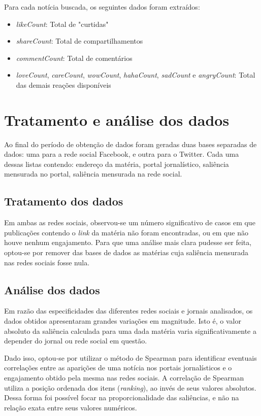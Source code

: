 \documentclass[
	12pt,
	oneside,
	a4paper,
	english,
	brazil
]{abntex2ppgsi}
\begin{document}
Para cada notícia buscada, os seguintes dados foram extraídos:
\begin{itemize}
    \item \textit{likeCount}: Total de "curtidas"
    \item \textit{shareCount}: Total de compartilhamentos
    \item \textit{commentCount}: Total de comentários
    \item \textit{loveCount}, \textit{careCount}, \textit{wowCount}, \textit{hahaCount}, \textit{sadCount} e \textit{angryCount}: Total das demais reações disponíveis
\end{itemize}

\section{Tratamento e análise dos dados}
Ao final do período de obtenção de dados foram geradas duas bases separadas de dados: uma para a rede social Facebook, e outra para o Twitter. Cada uma dessas listas contendo: endereço da matéria, portal jornalístico, saliência mensurada no portal, saliência mensurada na rede social.

\subsection{Tratamento dos dados}
Em ambas as redes sociais, observou-se um número significativo de casos em que publicações contendo o \textit{link} da matéria não foram encontradas, ou em que não houve nenhum engajamento. Para que uma análise mais clara pudesse ser feita, optou-se por remover das bases de dados as matérias cuja saliência mensurada nas redes sociais fosse nula.

\subsection{Análise dos dados}
Em razão das especificidades das diferentes redes sociais e jornais analisados, os dados obtidos apresentaram grandes variações em magnitude. Isto é, o valor absoluto da saliência calculada para uma dada matéria varia significativamente a depender do jornal ou rede social em questão.

Dado isso, optou-se por utilizar o método de Spearman para identificar eventuais correlações entre as aparições de uma notícia nos portais jornalísticos e o engajamento obtido pela mesma nas redes sociais. A correlação de Spearman utiliza a posição ordenada dos itens (\textit{ranking}), ao invés de seus valores absolutos. Dessa forma foi possível focar na proporcionalidade das saliências, e não na relação exata entre seus valores numéricos.
\end{document}
